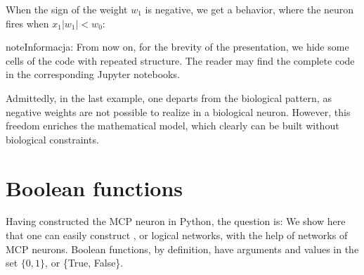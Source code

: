 \documentclass[a4paper,12pt,polish]{jupyterBook}
\begin{document}
\begin{sphinxVerbatimOutput}

\noindent{}
\end{sphinxVerbatimOutput}

\sphinxAtStartPar
When the sign of the weight \(w_1\) is negative, we get a  behavior, where the neuron fires when \(x_1 |w_1| < w_0\):
\begin{sphinxVerbatimOutput}

\noindent{}
\end{sphinxVerbatimOutput}

\begin{sphinxadmonition}{note}{Informacja:}
\sphinxAtStartPar
From now on, for the brevity of the presentation, we hide some cells of the code with repeated structure. The reader may find the complete code in the corresponding Jupyter notebooks.
\end{sphinxadmonition}

\sphinxAtStartPar
Admittedly, in the last example, one departs from the biological pattern, as negative weights are not possible to realize in a biological neuron. However, this freedom enriches the mathematical model, which clearly can be built without biological constraints.


\section{Boolean functions}
\label{\detokenize{docs/mcp:boolean-functions}}\label{\detokenize{docs/mcp:bool-sec}}
\sphinxAtStartPar
Having constructed the MCP neuron in Python, the question is:  We show here that one can easily construct , or logical networks, with the help of networks of MCP neurons. Boolean functions, by definition, have arguments and values in the set \(\{ 0,1 \}\), or \{True, False\}.
\end{document}
